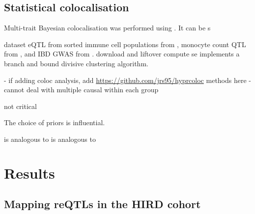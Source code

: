 
\subsection{Statistical colocalisation}
\label{subsec:hird_reQTL_coloc}

Multi-trait Bayesian colocalisation was performed using  \autocite{foley2019FastEfficientColocalization}.
It can be s

%
dataset
\gls{eQTL} from sorted immune cell populations from \textcite{schmiedel2018ImpactGeneticPolymorphisms},
monocyte count \gls{QTL} from \textcite{astle2016AllelicLandscapeHuman},
and \gls{IBD} \gls{GWAS} from \textcite{delange2017GenomewideAssociationStudy}.
download and liftover
compute se
%
 implements a branch and bound divisive clustering algorithm. 

- if adding coloc analysis, add \url{https://github.com/jrs95/hyprcoloc} methods here
- cannot deal with multiple causal within each group
%

not critical


The choice of priors is influential.

is analogous to
is analogous to




\section{Results}

\subsection{Mapping reQTLs in the HIRD cohort}

